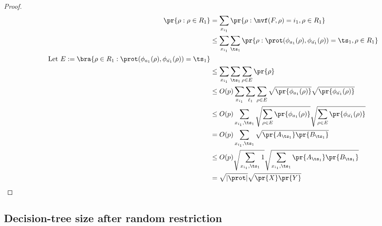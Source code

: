 \begin{proof}
\begin{align*}
    \pr{\rho: \rho \in R_1} %
                                    &=  \sum_{x_{i_1}}\pr{\rho: \nvf(F,\rho) = i_1, \rho \in R_1}\\
                                    &\leq \sum_{x_{i_1}} \sum_{\ts_1}\pr{\rho: \prot(\phi_{a_1}(\rho), \phi_{\bar{a_1}}(\rho)) = \ts_1, \rho \in R_1}\\
    \text{Let } E :=\bra{\rho \in R_1: \prot(\phi_{a_1}(\rho), \phi_{\bar{a_1}}(\rho)) = \ts_1} \\
                                    &\leq \sum_{x_{i_1}} \sum_{\ts_1} \sum_{\rho \in E} \pr{\rho}\\
                                    &\leq O(p) \sum_{x_{i_1}} \sum_{\ell_1}\sum_{\rho \in E} \sqrt{\pr{\phi_{a_1}(\rho)}}\sqrt{\pr{\phi_{\bar{a_1}}(\rho)}}\\
                                    &\leq O(p) \sum_{x_{i_1}, \ts_1} \sqrt{\sum_{\rho \in E}\pr{\phi_{a_1}(\rho)}} \sqrt{\sum_{\rho \in E}\pr{\phi_{\bar{a_1}}(\rho)}}\\
                                    &= O(p) \sum_{x_{i_1},\ts_1} \sqrt{\pr{A_{\ts_1}} \pr{B_{\ts_1}}}\\
                                    &\leq O(p) \sqrt{\sum_{x_{i_1},\ts_1} 1 } \sqrt{\sum_{x_{i_1},\ts_1}\pr{A_{\ts_1}} \pr{B_{\ts_1}}}\\
                                    &= \sqrt{|\prot|} \sqrt{\pr{X} \pr{Y}}
\end{align*}

\end{proof}

\subsection{Decision-tree size after random restriction}


